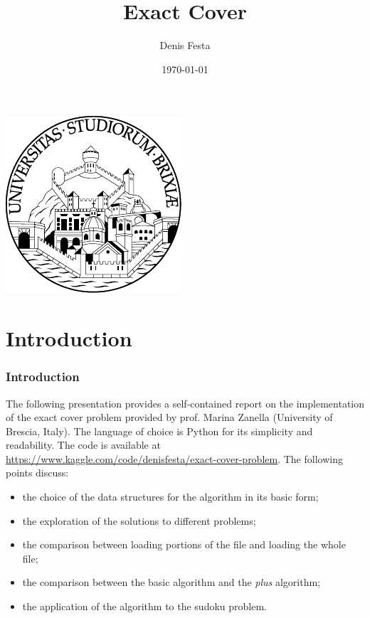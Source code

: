 \documentclass{beamer}
\title{Exact Cover}
\author{Denis Festa}
\date{\today}
\begin{document}
\begin{frame}
    \titlepage
    \centering
    \includegraphics[width=0.2\linewidth]{unibs-circ-logo.pdf}
\end{frame}



\section{Introduction}
\begin{frame}
    \frametitle{Introduction}

    The following presentation provides a self-contained report on the 
    implementation of the exact cover problem provided by prof. Marina Zanella
    (University of Brescia, Italy).
    The language of choice is Python for its simplicity and readability.
    The code is available at \url{https://www.kaggle.com/code/denisfesta/exact-cover-problem}.
    The following points discuss:
    \begin{itemize}
        \item the choice of the data structures for the algorithm in its basic form;
        \item the exploration of the solutions to different problems;
        \item the comparison between loading portions of the file and loading the 
            whole file;
        \item the comparison between the basic algorithm and the \textit{plus} 
            algorithm;
        \item the application of the algorithm to the sudoku problem.
    \end{itemize}

\end{frame}
\end{document}
